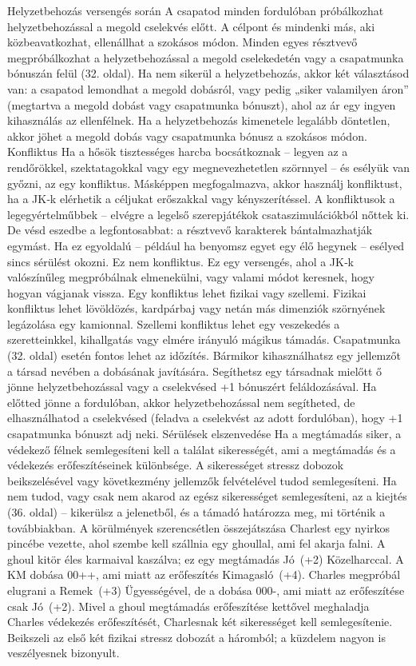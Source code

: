 \documentclass[oneside]{book}
\begin{document}
Helyzetbehozás versengés során
A csapatod minden fordulóban próbálkozhat helyzetbehozással a megold cselekvés előtt. A célpont és mindenki más, aki közbeavatkozhat, ellenállhat a szokásos módon. Minden egyes résztvevő megpróbálkozhat a helyzetbehozással a megold cselekedetén vagy a csapatmunka bónuszán felül (32. oldal). Ha nem sikerül a helyzetbehozás, akkor két választásod van: a csapatod lemondhat a megold dobásról, vagy pedig „siker valamilyen áron” (megtartva a megold dobást vagy csapatmunka bónuszt), ahol az ár egy ingyen kihasználás az ellenfélnek. Ha a helyzetbehozás kimenetele legalább döntetlen, akkor jöhet a megold dobás vagy csapatmunka bónusz a szokásos módon.
Konfliktus
Ha a hősök tisztességes harcba bocsátkoznak – legyen az a rendőrökkel, szektatagokkal vagy egy megnevezhetetlen szörnnyel – és esélyük van győzni, az egy konfliktus. Másképpen megfogalmazva, akkor használj konfliktust, ha a JK‑k elérhetik a céljukat erőszakkal vagy kényszerítéssel.
A konfliktusok a legegyértelműbbek – elvégre a legelső szerepjátékok csataszimulációkból nőttek ki. De vésd eszedbe a legfontosabbat: a résztvevő karakterek bántalmazhatják egymást. Ha ez egyoldalú – például ha benyomsz egyet egy élő hegynek – esélyed sincs sérülést okozni. Ez nem konfliktus. Ez egy versengés, ahol a JK‑k valószínűleg megpróbálnak elmenekülni, vagy valami módot keresnek, hogy hogyan vágjanak vissza.
Egy konfliktus lehet fizikai vagy szellemi. Fizikai konfliktus lehet lövöldözés, kardpárbaj vagy netán más dimenziók szörnyének legázolása egy kamionnal. Szellemi konfliktus lehet egy veszekedés a szeretteinkkel, kihallgatás vagy elmére irányuló mágikus támadás.
Csapatmunka (32. oldal) esetén fontos lehet az időzítés. Bármikor kihasználhatsz egy jellemzőt a társad nevében a dobásának javítására. Segíthetsz egy társadnak mielőtt ő jönne helyzetbehozással vagy a cselekvésed +1 bónuszért feláldozásával. Ha előtted jönne a fordulóban, akkor helyzetbehozással nem segítheted, de elhasználhatod a cselekvésed (feladva a cselekvést az adott fordulóban), hogy +1 csapatmunka bónuszt adj neki.
Sérülések elszenvedése
Ha a megtámadás siker, a védekező félnek semlegesíteni kell a találat sikerességét, ami a megtámadás és a védekezés erőfeszítéseinek különbsége.
A sikerességet stressz dobozok beikszelésével vagy következmény jellemzők felvételével tudod semlegesíteni. Ha nem tudod, vagy csak nem akarod az egész sikerességet semlegesíteni, az a kiejtés (36. oldal) – kikerülsz a jelenetből, és a támadó határozza meg, mi történik a továbbiakban.
A körülmények szerencsétlen összejátszása Charlest egy nyirkos pincébe vezette, ahol szembe kell szállnia egy ghoullal, ami fel akarja falni. A ghoul kitör éles karmaival kaszálva; ez egy megtámadás Jó~(+2) Közelharccal. A KM dobása 00++, ami miatt az erőfeszítés Kimagasló~(+4). Charles megpróbál elugrani a Remek~(+3) Ügyességével, de a dobása 000-, ami miatt az erőfeszítése csak Jó~(+2). Mivel a ghoul megtámadás erőfeszítése kettővel meghaladja Charles védekezés erőfeszítését, Charlesnak két sikerességet kell semlegesítenie. Beikszeli az első két fizikai stressz dobozát a háromból; a küzdelem nagyon is veszélyesnek bizonyult.
\end{document}
